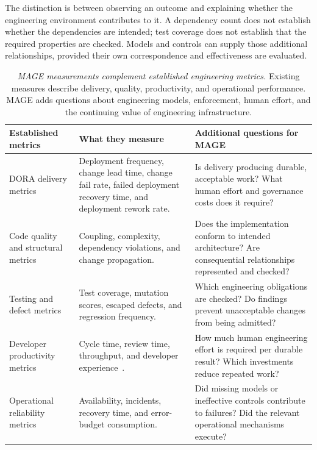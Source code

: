 The distinction is between observing an outcome and explaining whether the engineering environment contributes to it. A dependency count does not establish whether the dependencies are intended; test coverage does not establish that the required properties are checked. Models and controls can supply those additional relationships, provided their own correspondence and effectiveness are evaluated.

{\footnotesize
\begin{longtable}[]{@{}p{.25\linewidth}p{.32\linewidth}p{.33\linewidth}@{}}
\caption[Relationship to established engineering metrics]{\emph{MAGE measurements complement established engineering metrics.} Existing measures describe delivery, quality, productivity, and operational performance. MAGE adds questions about engineering models, enforcement, human effort, and the continuing value of engineering infrastructure.}\label{practicing-established-metrics}\\
\toprule
\textbf{Established metrics} & \textbf{What they measure} & \textbf{Additional questions for MAGE} \\
\midrule
\endhead
DORA delivery metrics & Deployment frequency, change lead time, change fail rate, failed deployment recovery time, and deployment rework rate. & Is delivery producing durable, acceptable work? What human effort and governance costs does it require? \\
Code quality and structural metrics & Coupling, complexity, dependency violations, and change propagation. & Does the implementation conform to intended architecture? Are consequential relationships represented and checked? \\
Testing and defect metrics & Test coverage, mutation scores, escaped defects, and regression frequency. & Which engineering obligations are checked? Do findings prevent unacceptable changes from being admitted? \\
Developer productivity metrics & Cycle time, review time, throughput, and developer experience~\citep{forsgren2021space}. & How much human engineering effort is required per durable result? Which investments reduce repeated work? \\
Operational reliability metrics & Availability, incidents, recovery time, and error-budget consumption. & Did missing models or ineffective controls contribute to failures? Did the relevant operational mechanisms execute? \\
\bottomrule
\end{longtable}
}

